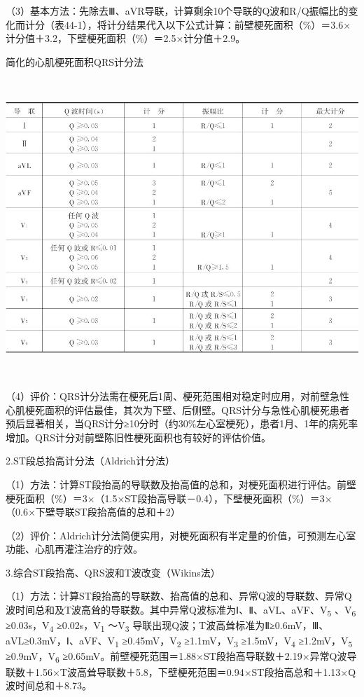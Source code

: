 （3）基本方法：先除去Ⅲ、aVR导联，计算剩余10个导联的Q波和R/Q振幅比的变化而计分（表44-1），将计分结果代入以下公式计算：前壁梗死面积（\%）＝3.6×计分值＋3.2，下壁梗死面积（\%）＝2.5×计分值＋2.9。

\begin{table}[htbp]
\centering
\caption{简化的心肌梗死面积QRS计分法}
\label{tab44-1}
\includegraphics[width=6.19792in,height=4.42708in]{./images/Image00726.jpg}
\end{table}

（4）评价：QRS计分法需在梗死后1周、梗死范围相对稳定时应用，对前壁急性心肌梗死面积的评估最佳，其次为下壁、后侧壁。QRS计分与急性心肌梗死患者预后显著相关，当QRS计分≥10分时（约30\%左心室梗死），患者1月、1年的病死率增加。QRS计分对前壁陈旧性梗死面积也有较好的评估价值。

2.ST段总抬高计分法（Aldrich计分法）

（1）方法：计算ST段抬高的导联数及抬高值的总和，对梗死面积进行评估。前壁梗死面积（\%）＝3×（1.5×ST段抬高导联－0.4），下壁梗死面积（\%）＝3×（0.6×下壁导联ST段抬高值的总和＋2）

（2）评价：Aldrich计分法简便实用，对梗死面积有半定量的价值，可预测左心室功能、心肌再灌注治疗的疗效。

3.综合ST段抬高、QRS波和T波改变（Wikins法）

（1）方法：计算ST段抬高的导联数、抬高值的总和、异常Q波的导联数、异常Q波时间总和及T波高耸的导联数。其中异常Q波标准为Ⅰ、Ⅱ、aVL、aVF、V\textsubscript{5}
、V\textsubscript{6} ≥0.03s，V\textsubscript{4}
≥0.02s，V\textsubscript{1} ～V\textsubscript{3}
导联出现Q波；T波高耸标准为Ⅱ≥0.6mV，Ⅲ、aVL≥0.3mV，Ⅰ、aVF、V\textsubscript{1}
≥0.45mV，V\textsubscript{2} ≥1.1mV，V\textsubscript{3}
≥1.5mV，V\textsubscript{4} ≥1.2mV，V\textsubscript{5}
≥0.9mV，V\textsubscript{6}
≥0.65mV。前壁梗死范围＝1.88×ST段抬高导联数＋2.19×异常Q波导联数＋1.56×T波高耸导联数＋5.8，下壁梗死范围＝0.94×ST段抬高总和＋1.13×Q波时间总和＋8.73。

